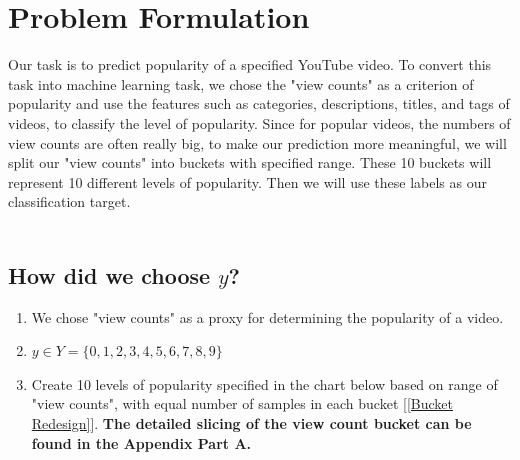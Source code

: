 \documentclass[english]{article}
\begin{document}
\section{Problem Formulation}
\begin{enumerate}
    Our task is to predict popularity of a specified YouTube video. To convert this task into machine learning task, we chose the "view counts" as a criterion of popularity and use the features such as categories, descriptions, titles, and tags of videos, to classify the level of popularity. Since for popular videos, the numbers of view counts are often really big, to make our prediction more meaningful, we will split our "view counts" into buckets with specified range. These 10 buckets will represent 10 different levels of popularity. Then we will use these labels as our classification target.\\ \\
    \subsection{How did we choose $y$?}
    \begin{enumerate}
        \item We chose "view counts" as a proxy for determining the popularity of a video.
        \item{$y \in Y = \{0,1,2,3,4,5,6,7,8,9\}$}
        \item Create 10 levels of popularity specified in the chart below based on range of "view counts", with equal number of samples in each bucket [\ref{Bucket Redesign}]. \bf{The detailed slicing of the view count bucket can be found in the Appendix Part A.}
    
    \end{enumerate}


\end{enumerate}
\end{document}
